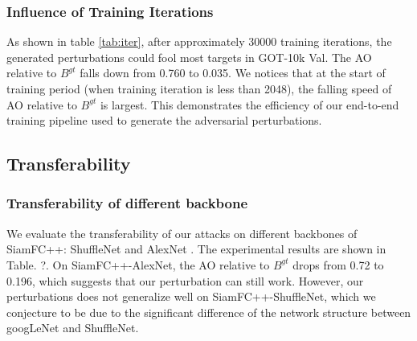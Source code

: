 \documentclass{article}
\begin{document}
\begin{table}[h]
\centering
{}
\caption{Different loss weight.}
\end{table}

\subsubsection{Influence of Training Iterations}

As shown in table \ref{tab:iter}, after approximately 30000 training iterations, the generated perturbations could fool most targets in GOT-10k Val. The AO relative to $B^{gt}$ falls down from 0.760 to 0.035. We notices that at the start of training period (when training iteration is less than 2048), the falling speed of AO relative to $B^{gt}$ is largest. This demonstrates the efficiency of our end-to-end training pipeline used to generate the adversarial perturbations.

\subsection{Transferability}

\subsubsection{Transferability of different backbone}

We evaluate the transferability of our attacks on different backbones of SiamFC++: ShuffleNet \cite{ShuffleNet} and AlexNet \cite{AlexNet}.
The experimental results are shown in Table. ?. On SiamFC++-AlexNet, the AO relative to $B^{gt}$ drops from 0.72 to 0.196, which suggests that our perturbation can still work. However, our perturbations does not generalize well on SiamFC++-ShuffleNet, which we conjecture to be due to the significant difference of the network structure between googLeNet and ShuffleNet.
\end{document}
